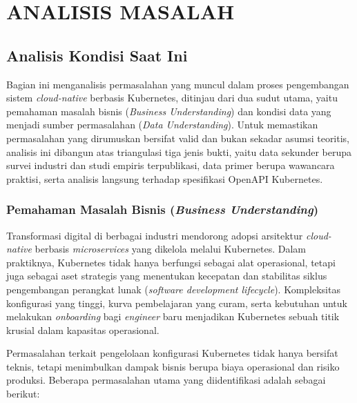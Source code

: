 ﻿%
\cleardoublepage
\chapter{ANALISIS MASALAH}
\label{chap:analisis-masalah}
\section{Analisis Kondisi Saat Ini}
\label{subsec:validasi-wawancara}
Bagian ini menganalisis permasalahan yang muncul dalam proses pengembangan sistem \textit{cloud-native} berbasis Kubernetes, ditinjau dari dua sudut utama, yaitu pemahaman masalah bisnis (\textit{Business Understanding}) dan kondisi data yang menjadi sumber permasalahan (\textit{Data Understanding}). Untuk memastikan permasalahan yang dirumuskan bersifat valid dan bukan sekadar asumsi teoritis, analisis ini dibangun atas triangulasi tiga jenis bukti, yaitu data sekunder berupa survei industri dan studi empiris terpublikasi, data primer berupa wawancara praktisi, serta analisis langsung terhadap spesifikasi OpenAPI Kubernetes.

\subsection{Pemahaman Masalah Bisnis (\textit{Business Understanding})}
Transformasi digital di berbagai industri mendorong adopsi arsitektur \textit{cloud-native} berbasis \textit{microservices} yang dikelola melalui Kubernetes. Dalam praktiknya, Kubernetes tidak hanya berfungsi sebagai alat operasional, tetapi juga sebagai aset strategis yang menentukan kecepatan dan stabilitas siklus pengembangan perangkat lunak (\textit{software development lifecycle}). Kompleksitas konfigurasi yang tinggi, kurva pembelajaran yang curam, serta kebutuhan untuk melakukan \textit{onboarding} bagi \textit{engineer} baru menjadikan Kubernetes sebuah titik krusial dalam kapasitas operasional.

Permasalahan terkait pengelolaan konfigurasi Kubernetes tidak hanya bersifat teknis, tetapi menimbulkan dampak bisnis berupa biaya operasional dan risiko produksi. Beberapa permasalahan utama yang diidentifikasi adalah sebagai berikut:

